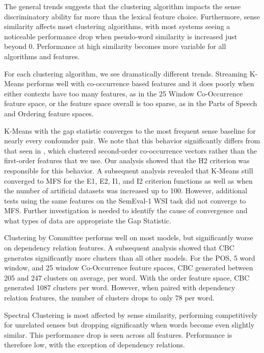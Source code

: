 \documentclass[11pt]{article}
\begin{document}
The general trends suggests that the clustering algorithm impacts the sense
discriminatory ability far more than the lexical feature choice.  Furthermore,
sense similarity affects most clustering algorithms, with most systems seeing a
noticeable performance drop when pseudo-word similarity is increased just beyond
0.  Performance at high similarity becomes more variable for all algorithms and
features.

For each clustering algorithm, we see dramatically different trends.  
%
Streaming K-Means performs well with co-occurrence based features and it does
poorly when either contexts have too many features, as in the 25 Window
Co-Occurrence feature space, or the feature space overall is too sparse, as in
the Parts of Speech and Ordering feature spaces.

K-Means with the gap statistic converges to the most frequent sense baseline for
nearly every confounder pair.  We note that this behavior significantly differs
from that seen in \cite{pedersen06automaticcluster}, which clustered
second-order co-occurrence vectors rather than the first-order features that we
use.  Our analysis showed that the H2 criterion was responsible for this
behavior.  A subsequent analysis revealed that K-Means still converged to MFS
for the E1, E2, I1, and I2 criterion functions \cite{zhao02criterionfunctions}
as well as when the number of artificial datasets was increased up to 100.
However, additional tests using the same features on the SemEval-1 WSI task did
not converge to MFS.  Further investigation is needed to identify the cause of
convergence and what types of data are appropriate the Gap Statistic.

Clustering by Committee performs well on most models, but significantly worse on
dependency relation features.  A subsequent analysis showed that CBC
generates significantly more clusters than all other models.  For the POS, 5
word window, and 25 window Co-Occurrence feature spaces, CBC generated between
205 and 247 clusters on average, per word.  With the order feature space, CBC
generated 1087 clusters per word.  However, when paired with dependency relation
features, the number of clusters drops to only 78 per word.  

Spectral Clustering is most affected by sense similarity, performing
competitively for unrelated senses but dropping significantly when words become
even slightly similar.  This performance drop is seen across all features.
Performance is therefore low, with the exception of dependency relations.
\end{document}
